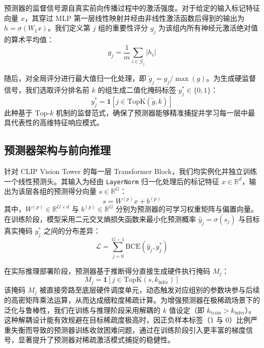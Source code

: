 \documentclass[sigconf]{acmart}
\begin{document}
预测器的监督信号源自真实前向传播过程中的激活强度。对于给定的输入标记特征向量 $x$，其穿过 MLP 第一层线性映射并经由非线性激活函数后得到的输出为 $h = \sigma(W_1 x)$。我们定义第 $j$ 组的重要性评分 $g_j$ 为该组内所有神经元激活绝对值的算术平均值：
\begin{equation}
    g_j = \frac{1}{m}\sum_{i \in \mathcal{G}_j} |h_i|
\end{equation}

随后，对全局评分进行最大值归一化处理，即 $\tilde{g}_j = g_j / \max(g)$。为生成硬监督信号，我们选取评分排名前 $k$ 的组生成二值化掩码标签 $y_j^{*} \in \{0, 1\}$：
\begin{equation}
    y_j^{*} = \mathbf{1}[j \in \mathrm{TopK}(\tilde{g}, k)]
\end{equation}
此种基于 $\mathrm{Top\text{-}}k$ 机制的监督范式，确保了预测器能够精准捕捉并学习每一层中最具代表性的高维特征响应模式。

\subsection{预测器架构与前向推理}
针对 CLIP Vision Tower 的每一层 Transformer Block，我们均实例化并独立训练一个线性预测头。其输入为经由 \texttt{LayerNorm} 归一化处理后的标记特征 $x \in \mathbb{R}^d$，输出为该层各组的预测得分向量 $s \in \mathbb{R}^G$：
\begin{equation}
    s = W^{(p)} x + b^{(p)}
\end{equation}
其中，$W^{(p)} \in \mathbb{R}^{G \times d}$ 与 $b^{(p)} \in \mathbb{R}^G$ 分别为预测器的可学习权重矩阵与偏置向量。在训练阶段，模型采用二元交叉熵损失函数来最小化预测概率 $\hat{y}_j = \sigma(s_j)$ 与目标真实掩码 $y_j^{*}$ 之间的分布差异：
\begin{equation}
    \mathcal{L} = \sum_{j=0}^{G-1} \mathrm{BCE}(\hat{y}_{j}, y_{j}^{*})
\end{equation}

在实际推理部署阶段，预测器基于推断得分直接生成硬件执行掩码 $M_j$：
\begin{equation}
    M_j = \mathbf{1}[j \in \mathrm{TopK}(s, k_{\mathrm{infer}})]
\end{equation} 
该掩码 $M_j$ 被直接旁路至底层硬件调度单元，动态触发对应组别的参数块参与后续的高密矩阵乘法运算，从而达成细粒度稀疏计算。为增强预测器在极稀疏场景下的泛化与鲁棒性，我们在训练与推理阶段采用解耦的 $k$ 值设定（即 $k_{\mathrm{train}} > k_{\mathrm{infer}}$）。这种解耦设计能有效规避在目标稀疏度极高时，因正负样本标签（1 与 0）比例严重失衡而导致的预测器训练收敛困难问题，通过在训练阶段引入更丰富的梯度信号，显著提升了预测器对稀疏激活模式捕捉的稳健性。
\end{document}
